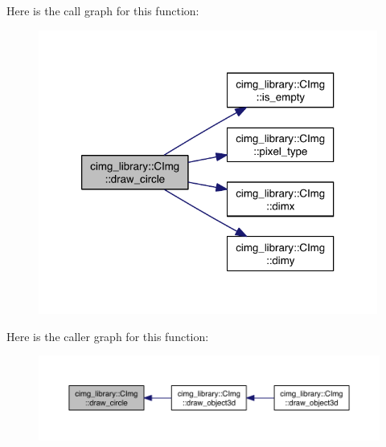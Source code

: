 Here is the call graph for this function\-:
\nopagebreak
\begin{figure}[H]
\begin{center}
\leavevmode
\includegraphics[width=316pt]{structcimg__library_1_1_c_img_a8328a10f9e96fd585d2a032b03e9e781_cgraph}
\end{center}
\end{figure}




Here is the caller graph for this function\-:
\nopagebreak
\begin{figure}[H]
\begin{center}
\leavevmode
\includegraphics[width=350pt]{structcimg__library_1_1_c_img_a8328a10f9e96fd585d2a032b03e9e781_icgraph}
\end{center}
\end{figure}


